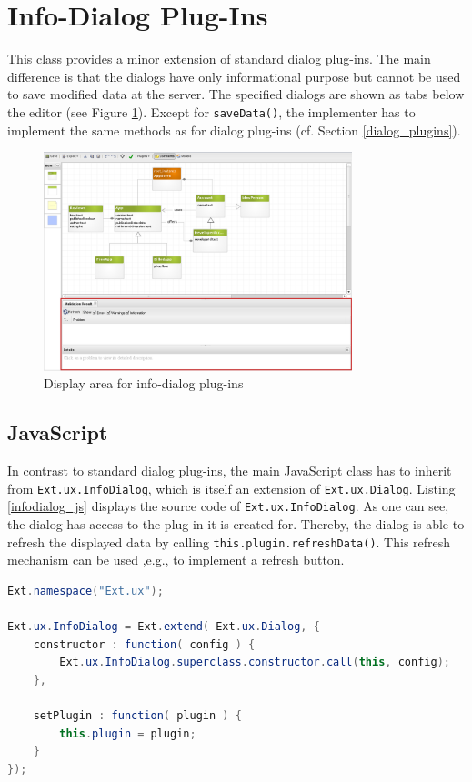 \section{Info-Dialog Plug-Ins}
	  This class provides a minor extension of standard dialog plug-ins. The main difference is that the dialogs have only informational purpose but cannot be used to save modified data at the server. The specified dialogs are shown as tabs below the editor (see Figure \ref{info_dialog_screenshot}). Except for \verb!saveData()!, the implementer has to implement the same methods as for dialog plug-ins (cf. Section \ref{dialog_plugins}).

	\begin{figure}[ht]
	  \centering
	  \includegraphics[width=0.8\textwidth]{graphics/info_dialog_screenshot}
	  \caption{Display area for info-dialog plug-ins}
	  \label{info_dialog_screenshot}
	\end{figure}

	\subsection{JavaScript}
	In contrast to standard dialog plug-ins, the main JavaScript class has to inherit from \verb!Ext.ux.InfoDialog!, which is itself an extension of \verb!Ext.ux.Dialog!. Listing \ref{infodialog_js} displays the source code of \verb!Ext.ux.InfoDialog!. As one can see, the dialog has access to the plug-in it is created for. Thereby, the dialog is able to refresh the displayed data by calling \verb!this.plugin.refreshData()!. This refresh mechanism can be used ,e.g., to implement a refresh button.
	\clearpage
	\begin{lstlisting}[language=Java, caption=Ext.ux.Dialog, label=infodialog_js]
Ext.namespace("Ext.ux");

Ext.ux.InfoDialog = Ext.extend( Ext.ux.Dialog, {
    constructor : function( config ) {
        Ext.ux.InfoDialog.superclass.constructor.call(this, config);
    },

    setPlugin : function( plugin ) {
        this.plugin = plugin;
    }
});
	\end{lstlisting}
	